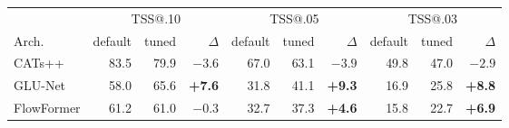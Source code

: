 \begin{tabular}{l rrr rrr rrr}
\toprule
  & \multicolumn{3}{c}{TSS@.10} & \multicolumn{3}{c}{TSS@.05} & \multicolumn{3}{c}{TSS@.03} \\
\cmidrule(lr){2-4} \cmidrule(lr){5-7} \cmidrule(lr){8-10}
Arch. & default & tuned & $\Delta$ & default & tuned & $\Delta$ & default & tuned & $\Delta$ \\
\midrule
CATs++ & 83.5 & 79.9 & $-3.6$ & 67.0 & 63.1 & $-3.9$ & 49.8 & 47.0 & $-2.9$ \\
GLU-Net & 58.0 & 65.6 & \textbf{+7.6} & 31.8 & 41.1 & \textbf{+9.3} & 16.9 & 25.8 & \textbf{+8.8} \\
FlowFormer & 61.2 & 61.0 & $-0.3$ & 32.7 & 37.3 & \textbf{+4.6} & 15.8 & 22.7 & \textbf{+6.9} \\
\bottomrule
\end{tabular}

